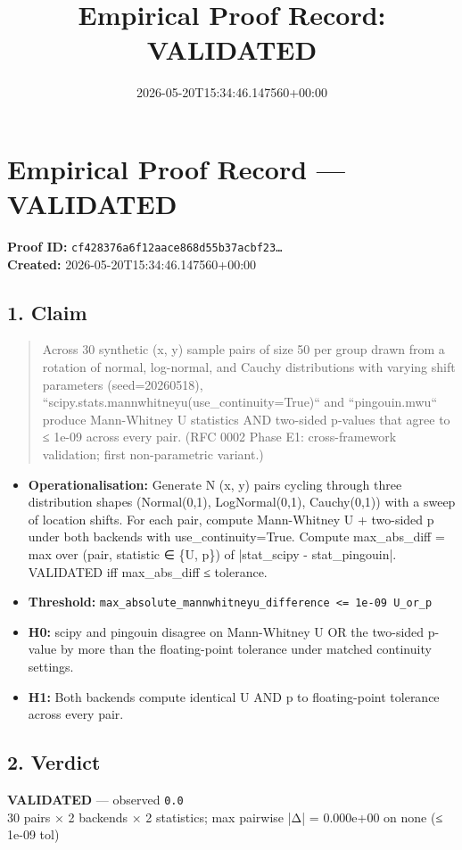 \documentclass{article}
\title{Empirical Proof Record: VALIDATED}
\date{2026-05-20T15:34:46.147560+00:00}
\begin{document}
\maketitle
\section*{Empirical Proof Record --- \textcolor{validated}{\textbf{VALIDATED}}}
\textbf{Proof ID:} \texttt{cf428376a6f12aace868d55b37acbf23\dots}\\
\textbf{Created:} 2026-05-20T15:34:46.147560+00:00
\subsection*{1. Claim}
\begin{quote}Across 30 synthetic (x, y) sample pairs of size 50 per group drawn from a rotation of normal, log-normal, and Cauchy distributions with varying shift parameters (seed=20260518), ``scipy.stats.mannwhitneyu(use\_continuity=True)`` and ``pingouin.mwu`` produce Mann-Whitney U statistics AND two-sided p-values that agree to ≤ 1e-09 across every pair. (RFC 0002 Phase E1: cross-framework validation; first non-parametric variant.)\end{quote}
\begin{itemize}
\item \textbf{Operationalisation:} Generate N (x, y) pairs cycling through three distribution shapes (Normal(0,1), LogNormal(0,1), Cauchy(0,1)) with a sweep of location shifts. For each pair, compute Mann-Whitney U + two-sided p under both backends with use\_continuity=True. Compute max\_abs\_diff = max over (pair, statistic ∈ \{U, p\}) of |stat\_scipy - stat\_pingouin|. VALIDATED iff max\_abs\_diff ≤ tolerance.
\item \textbf{Threshold:} \texttt{max\_absolute\_mannwhitneyu\_difference <= 1e-09 U\_or\_p}
\item \textbf{H0:} scipy and pingouin disagree on Mann-Whitney U OR the two-sided p-value by more than the floating-point tolerance under matched continuity settings.
\item \textbf{H1:} Both backends compute identical U AND p to floating-point tolerance across every pair.
\end{itemize}
\subsection*{2. Verdict}
\textcolor{validated}{\textbf{VALIDATED}} --- observed \texttt{0.0}\\
30 pairs × 2 backends × 2 statistics; max pairwise |Δ| = 0.000e+00 on none (≤ 1e-09 tol)
\end{document}

